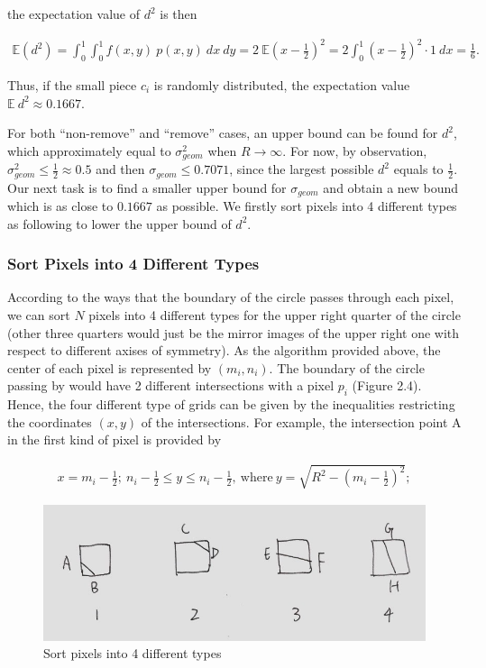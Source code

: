 \documentclass[letterpaper]{article}
\numberwithin{equation}{section} %
\numberwithin{figure}{section} %
\numberwithin{table}{section} %
\begin{document}
\noindent
the expectation value of $d^2$ is then

\begin{align} 
\mathbb{E}(d^2) = \int_{0}^{1} \int_{0}^{1}f(x,y) \ p(x,y) \ dx \ dy = 2 \  \mathbb{E}(x-\frac{1}{2})^2 = 2 \int_{0}^{1}(x-\frac{1}{2})^2 \cdot 1 \ dx = \frac{1}{6}.
\end{align}

\noindent
Thus, if the small piece $c_i$ is randomly distributed, the expectation value $\mathbb{E}\ d^2 \approx 0.1667$. 

For both \enquote{non-remove} and \enquote{remove} cases, an upper bound can be found for $d^2$, which approximately equal to $\sigma_{geom}^2$ when $R \rightarrow \infty$. For now, by observation, $\sigma_{geom}^2 \leq \frac{1}{2} \approx 0.5$ and then $\sigma_{geom} \leq 0.7071$, since the largest possible $d^2$ equals to $\frac{1}{2}$. Our next task is to find a smaller upper bound for  $\sigma_{geom}$ and obtain a new bound which is as close to $0.1667$ as possible. We firstly sort pixels into 4 different types as following to lower the upper bound of $d^2$.

\subsubsection{Sort Pixels into 4 Different Types}
According to the ways that the boundary of the circle passes through each pixel, we can sort $N$ pixels into 4 different types for the upper right quarter of the circle (other three quarters would just be the mirror images of the upper right one with respect to different axises of symmetry). As the algorithm provided above, the center of each pixel is represented by $(m_i, n_i)$. The boundary of the circle passing by would have 2 different intersections with a pixel $p_i$ (Figure 2.4). Hence, the four different type of grids can be given by the inequalities restricting the coordinates $(x,y)$ of the intersections. For example, the intersection point A in the first kind of pixel is provided by  

\begin{align} 
x=m_i-\frac{1}{2}; \ n_i-\frac{1}{2}\leq y \leq n_i-\frac{1}{2}, \ \text{where} \ y=\sqrt{R^2-(m_i-\frac{1}{2})^2};
\end{align}

\begin{figure}[h]
	\centering
	\includegraphics[width=0.5\linewidth]{4ty}
	\caption{Sort pixels into 4 different types}
	\label{fig:4ty}
\end{figure}
\end{document}
